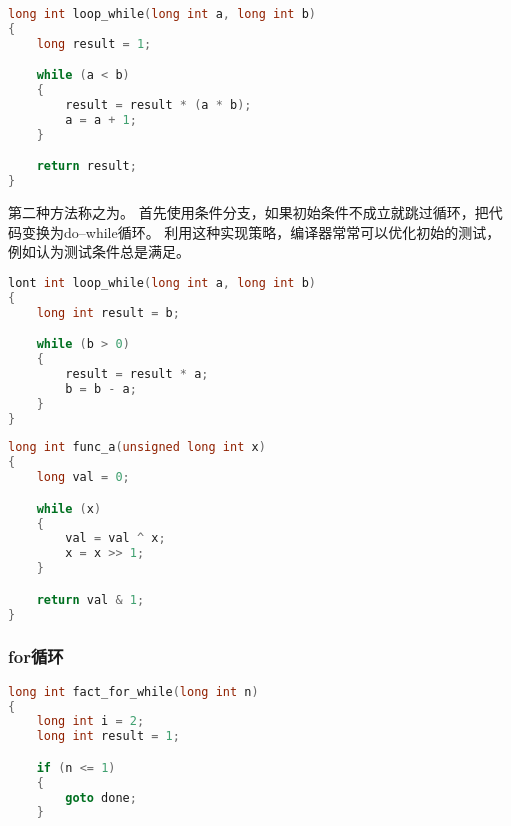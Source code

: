 {{{            %
            \begin{practicec}
                \begin{lstlisting}[language=C]
long int loop_while(long int a, long int b)
{
    long result = 1;

    while (a < b)
    {
        result = result * (a * b);
        a = a + 1;
    }

    return result;
}
                \end{lstlisting}
            \end{practicec}

            第二种方法称之为。
            首先使用条件分支，如果初始条件不成立就跳过循环，把代码变换为do--while循环。
            利用这种实现策略，编译器常常可以优化初始的测试，例如认为测试条件总是满足。

            \begin{practicec}
                \begin{lstlisting}[language=C]
lont int loop_while(long int a, long int b)
{
    long int result = b;

    while (b > 0)
    {
        result = result * a;
        b = b - a;
    }
}
                \end{lstlisting}
            \end{practicec}

            \begin{practicec}
                \begin{lstlisting}[language=C]
long int func_a(unsigned long int x)
{
    long val = 0;

    while (x)
    {
        val = val ^ x;
        x = x >> 1;
    }

    return val & 1;
}
                \end{lstlisting}
            \end{practicec}
        }

        \subsubsection{for循环}
        {
            \begin{practicec}
                \begin{lstlisting}[language=C]
long int fact_for_while(long int n)
{
    long int i = 2;
    long int result = 1;

    if (n <= 1)
    {
        goto done;
    }


\end{lstlisting}
\end{practicec}}}}
